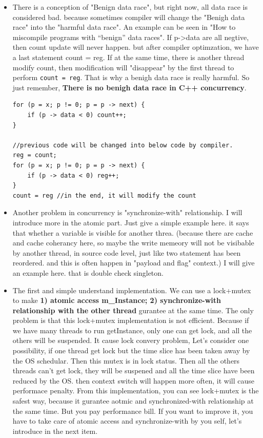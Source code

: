 \documentclass[a4paper,11pt,twoside]{book}
\begin{document}
\begin{itemize}
    \item There is a conception of "Benign data race", but right now, all data race is considered bad. because sometimes compiler will change the "Benigh data race" into the "harmful data race". An example can be seen in "How to miscompile programs with “benign” data races". If p->data are all negtive, then count update will never happen. but after compiler optimzation, we have a last statement count = reg.  If at the same time, there is another thread modify count, then modification will "disappear" by the first thread to perform \texttt{count = reg}. That is why a benigh data race is really harmful. So just remember, \textbf{There is no benigh data race in C++ concurrency}.
\begin{lstlisting}[]
for (p = x; p != 0; p = p -> next) {
    if (p -> data < 0) count++;
} 

//previous code will be changed into below code by compiler.
reg = count;
for (p = x; p != 0; p = p -> next) {
    if (p -> data < 0) reg++;
}
count = reg //in the end, it will modify the count
\end{lstlisting}

    \item Another problem in concurrency is "synchronize-with" relationship. I will introduce more in the atomic part. Just give a simple example here. it says that whether a variable is visible for another threa. (because there are cache and cache coherancy here, so maybe the write memeory will not be visibable by another thread, in source code level, just like two statement has been reordered. and this is often happen in "payload and flag" context.) I will give an example here. that is double check singleton.

    \item The first and simple understand implementation. We can use a lock+mutex to make \textbf{1) atomic access m\_Instance; 2) synchronize-with relationship with the other thread} gurantee at the same time. The only problem is that this lock+mutex implementation is not efficient.  Because if we have many threads to run getInstance, only one can get lock, and all the others will be suspended. It cause lock convery problem, Let's consider one possibility, if one thread get lock but the time slice has been taken away by the OS schedular. Then this mutex is in lock status. Then all the others threads can't get lock,  they will be suspened and all the time slice have been reduced by the OS. then context switch will happen more often, it will cause performace penalty.  From this implementation, you can see lock+mutex is the safest way, because it gurantee aotmic and synchronized-with relationship at the same time. But you pay performance bill. If you want to improve it, you have to take care of atomic access and synchronize-with by you self, let's introduce in the next item.


\end{itemize}
\end{document}
